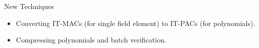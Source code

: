 \begin{frame}{New Techniques}
	\begin{itemize}
		\item Converting IT-MACs (for single field element) to IT-PACs (for polynomials).
		\item Compressing polynomials and batch verification.
	\end{itemize}
\end{frame}